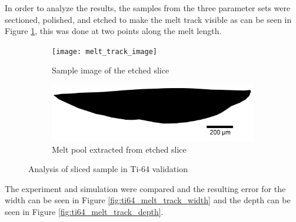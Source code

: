 \documentclass[pdflatex,sn-mathphys]{sn-jnl}
\begin{document}
	
	In order to analyze the results, the samples from the three parameter sets were sectioned, polished, and etched to make the melt track visible as can be seen in Figure \ref{fig:melt_track_image}, this was done at two points along the melt length.  
	\begin{figure}[!htb]
		\centering
			\begin{subfigure}{0.495\textwidth}
			\texttt{[image: melt\_track\_image]}
			\caption{Sample image of the etched slice}
			\label{fig:melt_track_image}
			\end{subfigure}
				\begin{subfigure}{0.495\textwidth}
				\includegraphics[width=\textwidth]{melt_track_bitmap}
				\caption{Melt pool extracted from etched slice}
				\label{fig:melt_track_bitmap}
				\end{subfigure}
		\caption{Analysis of sliced sample in Ti-64 validation}
		\label{fig:melt_track}
	\end{figure}
	The experiment and simulation were compared and the resulting error for the width can be seen in Figure \ref{fig:ti64_melt_track_width} and the depth can be seen in Figure \ref{fig:ti64_melt_track_depth}.
\end{document}
